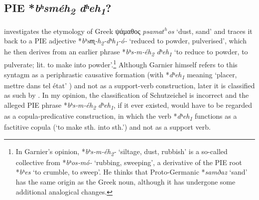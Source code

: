 \documentclass[output=paper,colorlinks,citecolor=brown]{langscibook}
\begin{document}
\subsection{PIE *\textit{bʰsméh\textsubscript{2} dʰeh\textsubscript{1}}?}

\citet{Garnier2006} investigates the etymology of Greek ψάμαθος \textit{psama$t^h$os} ‘dust, sand’ and traces it back to a PIE adjective *\textit{bʰsm̥‑h\textsubscript{2}‑dʰh\textsubscript{1}‑ó‑} ‘reduced to powder, pulverised’, which he then derives from an earlier phrase *\textit{bʰs‑m‑éh\textsubscript{2} dʰeh\textsubscript{1}} ‘to reduce to powder, to pulverate; lit. to make into powder’.\footnote{In Garnier’s opinion, *\textit{bʰs‑m‑éh\textsubscript{2}‑} ‘siltage, dust, rubbish’ is a so-called collective from *\textit{bʰos‑mó‑} ‘rubbing, sweeping’, a derivative of the PIE root *\textit{bʰes} ‘to crumble, to sweep’. He thinks that Proto-Germanic *\textit{samðaz} ‘sand’ has the same origin as the Greek noun, although it has undergone some additional analogical changes.}      Although Garnier himself refers to this syntagm as a periphrastic causative formation (with *\textit{dʰeh\textsubscript{1}} meaning `placer, mettre dans tel état' \citealt[82]{Garnier2006}) and not as a support-verb construction, later it is classified as such by \citet[109]{Schutzeichel2014}. In my opinion, the classification of Schutzeichel is incorrect and the alleged PIE phrase *\textit{bʰs‑m‑éh\textsubscript{2} dʰeh\textsubscript{1}}, if it ever existed, would have to be regarded as a copula-predicative construction, in which the verb *\textit{dʰeh\textsubscript{1}} functions as a factitive copula (‘to make sth. into sth.’) and not as a support verb.
\end{document}
